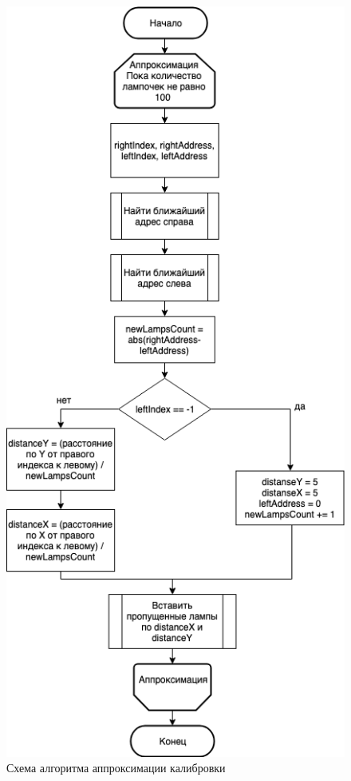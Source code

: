 \newpage
{}
\label{app:algorithms}

\begin{figure}[H]
\centering
	\includegraphics[scale=0.5]{figures/approximation.png}
	\caption{Схема алгоритма аппроксимации калибровки}
	\label{fig:appendices:algorithms:approximation}
\end{figure}

